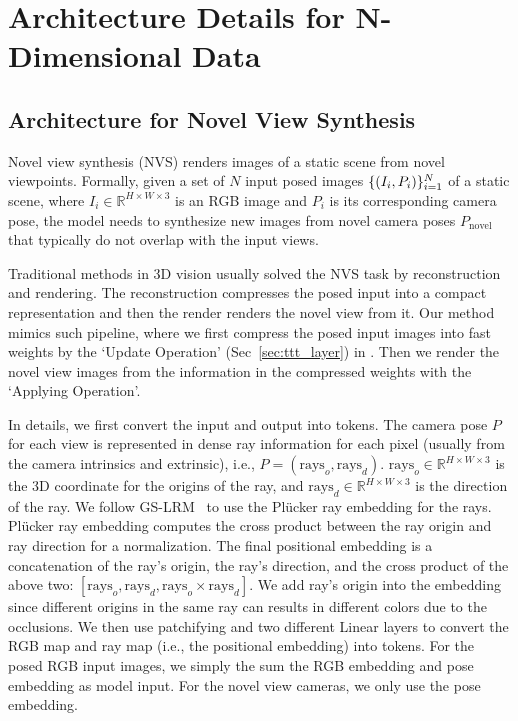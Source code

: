 \section{\methodname{} Architecture Details for N-Dimensional Data }
\label{sec:appen_model_arch}

\subsection{\methodname{} Architecture for Novel View Synthesis}
\label{sec:appen_nvs_model_arch}

Novel view synthesis (NVS) renders images of a static scene from novel viewpoints. 
Formally, given a set of $N$ input posed images $\{ (  I_i, P_i ) \}_{i=1}^N$ of a static scene, 
where $I_i \in \mathbb{R}^{H\times W \times 3}$ is an RGB image and $P_i$ is its corresponding camera pose,
the model needs to synthesize new images from novel camera poses $P_\text{novel}$ that typically do not overlap with the input views. 


Traditional methods in 3D vision usually solved the NVS task by reconstruction and rendering. 
The reconstruction compresses the posed input into a compact representation and then the render renders the novel view from it.
Our method mimics such pipeline, where we first compress the posed input images into fast weights by the `Update Operation' (Sec~\ref{sec:ttt_layer}) in \methodname{}.
Then we render the novel view images from the information in the compressed weights with the `Applying Operation'.

In details, we first convert the input and output into tokens.
The camera pose $P$ for each view is represented in dense ray information for each pixel (usually from the camera intrinsics and extrinsic), i.e., $P = (\text{rays}_o, \text{rays}_d)$.
$\text{rays}_o \in \mathbb{R}^{H\times W \times 3}$ is the 3D coordinate for the origins of the ray, and $\text{rays}_d \in \mathbb{R}^{H\times W \times 3}$ is the direction of the ray.
We follow GS-LRM~\cite{zhang2024gs} to use the Pl\"ucker ray embedding for the rays.
Pl\"ucker ray embedding computes the cross product between the ray origin and ray direction for a normalization.
The final positional embedding is a concatenation of the ray's origin, the ray's direction, and the cross product of the above two:
$[\text{rays}_o, \text{rays}_d, \text{rays}_o \times \text{rays}_d]$.
We add ray's origin into the embedding since different origins in the same ray can results in different colors due to the occlusions.
We then use patchifying and two different Linear layers to convert the RGB map and ray map (i.e., the positional embedding) into tokens.
For the posed RGB input images, we simply the sum the RGB embedding and pose embedding as model input.
For the novel view cameras, we only use the pose embedding.

